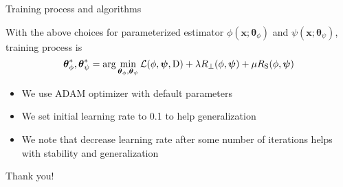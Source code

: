 \documentclass[11pt,aspectratio=169,t]{beamer}
\renewcommand{\vec}[1]{\boldsymbol{#1}}
\newcommand{\VTheta}{\ensuremath{\vec{\theta}}}
\newcommand{\xx}{\vec{x}}
\begin{document}
\begin{frame}{Training process and algorithms}

With the above choices for parameterized estimator $\phi(\xx; \VTheta_{\phi})$
and $\psi(\xx; \VTheta_{\psi})$, training process is
\[
\VTheta_{\phi}^{*}, \VTheta_{\psi}^{*} =
\arg \min_{\VTheta_\phi, \VTheta_\psi} \mathcal L(\phi, \vec \psi, \mathrm D)
  + \lambda R_{\perp}(\phi, \vec \psi) + \mu R_{\text S}(\phi, \vec \psi)
\]

\begin{itemize}
    \item We use ADAM optimizer with default parameters
    \item We set initial learning rate to 0.1 to help generalization
    \item We note that decrease learning rate after some number of iterations
        helps with stability and generalization
\end{itemize}
\end{frame}

\begin{frame}[standout]
\centering
\Huge
Thank you!
\end{frame}
\end{document}
